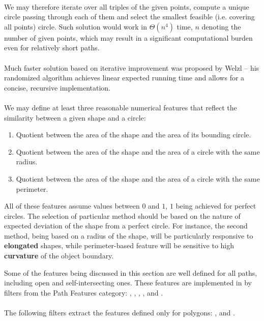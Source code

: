 \paragraph*{}
We may therefore iterate over all triples of the given points, compute a unique circle passing through each of them and select the smallest feasible (i.e. covering all points) circle. Such solution would work in $\Theta(n^4)$ time, $n$ denoting the number of given points, which may result in a significant computational burden even for relatively short paths.

\paragraph*{}
Much faster solution based on iterative improvement was proposed\cite{Welzl91} by Welzl -- his randomized algorithm achieves linear expected running time and allows for a concise, recursive implementation.

\paragraph*{}
We may define at least three reasonable numerical features that reflect the similarity between a given shape and a circle:
\begin{enumerate}
	\item Quotient between the area of the shape and the area of its bounding circle.
	\item Quotient between the area of the shape and the area of a circle with the same radius.
	\item Quotient between the area of the shape and the area of a circle with the same perimeter.
\end{enumerate}
All of these features assume values between $0$ and $1$, $1$ being achieved for perfect circles. The selection of particular method should be based on the nature of expected deviation of the shape from a perfect circle. For instance, the second method, being based on a radius of the shape, will be particularly responsive to \textbf{elongated} shapes, while perimeter-based feature will be sensitive to high \textbf{curvature} of the object boundary.

\begin{refImpl}
Some of the features being discussed in this section are well defined for all paths, including open and self-intersecting ones. These features are implemented in \studio by filters from the Path Features category:
,
, 
, 
,
 and
.

\paragraph*{}
The following \studio filters extract the features defined only for polygons: 
, 
 and 
.
\end{refImpl}